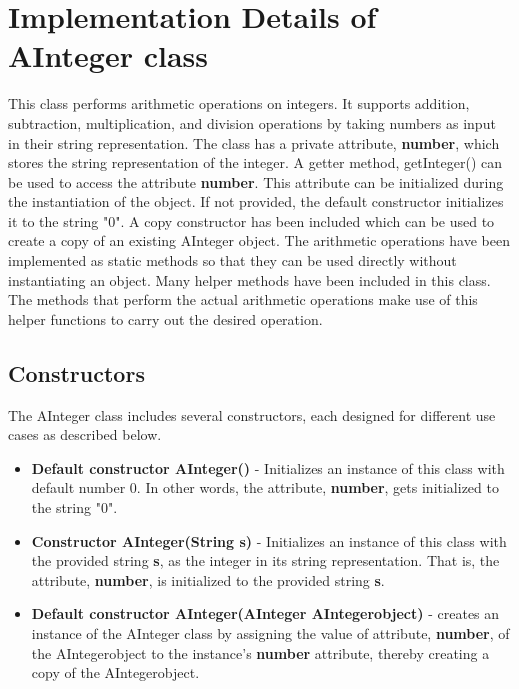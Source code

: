 \documentclass[a4paper,12pt]{article}
\begin{document}
\section{Implementation Details of AInteger class}
This class performs arithmetic operations on integers. It supports addition, subtraction, multiplication, and division operations by taking numbers as input in their string representation. The class has a private attribute, \textbf{number}, which stores the string representation of the integer. A getter method, getInteger() can be used to access the attribute \textbf{number}. This attribute can be initialized during the instantiation of the object. If not provided, the default constructor initializes it to the string "$0$". A copy constructor has been included which can be used to create a copy of an existing AInteger object. The arithmetic operations have been implemented as static methods so that they can be used directly without instantiating an object. Many helper methods have been included in this class. The methods that perform the actual arithmetic operations make use of this helper functions to carry out the desired operation.

\subsection{Constructors}
The AInteger class includes several constructors, each designed for different use cases as described below.

\begin{itemize}
    \item \textbf{Default constructor AInteger()} - Initializes an instance of this class with default number $0$. In other words, the attribute, \textbf{number}, gets initialized to the string "$0$".
    \item \textbf{Constructor AInteger(String s)} - Initializes an instance of this class with the provided string \textbf{s}, as the integer in its string representation. That is, the attribute, \textbf{number}, is initialized to the provided string \textbf{s}.
    \item \textbf{Default constructor AInteger(AInteger AIntegerobject)} - creates an instance of the AInteger class by assigning the value of attribute, \textbf{number}, of the AIntegerobject to the instance's \textbf{number} attribute, thereby creating a copy of the AIntegerobject.
\end{itemize}
\end{document}
